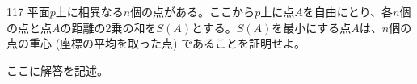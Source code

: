 \begin{thm}{117}{}{}
 平面$p$上に相異なる$n$個の点がある。ここから$p$上に点$A$を自由にとり、各$n$個の点と点$A$の距離の2乗の和を$S(A)$とする。$S(A)$を最小にする点$A$は、$n$個の点の重心 (座標の平均を取った点) であることを証明せよ。
\end{thm}

ここに解答を記述。